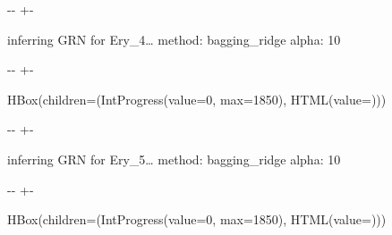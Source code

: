 \documentclass[letterpaper,10pt,english]{sphinxmanual}
\newlength\nbsphinxcodecellspacing
\begin{document}
%
{
\kern-\sphinxverbatimsmallskipamount\kern-\baselineskip
\kern+\FrameHeightAdjust\kern-\fboxrule
\vspace{\nbsphinxcodecellspacing}
%
\begin{sphinxVerbatim}[commandchars=\\\{\}]

inferring GRN for Ery\_4{\ldots}
method: bagging\_ridge
alpha: 10
\end{sphinxVerbatim}
}
\relax

{

\kern-\sphinxverbatimsmallskipamount\kern-\baselineskip
\kern+\FrameHeightAdjust\kern-\fboxrule
\vspace{\nbsphinxcodecellspacing}

%
\begin{sphinxVerbatim}[commandchars=\\\{\}]
HBox(children=(IntProgress(value=0, max=1850), HTML(value=\PYGZsq{}\PYGZsq{})))
\end{sphinxVerbatim}
}



%
{
\kern-\sphinxverbatimsmallskipamount\kern-\baselineskip
\kern+\FrameHeightAdjust\kern-\fboxrule
\vspace{\nbsphinxcodecellspacing}
%
\begin{sphinxVerbatim}[commandchars=\\\{\}]

inferring GRN for Ery\_5{\ldots}
method: bagging\_ridge
alpha: 10
\end{sphinxVerbatim}
}
\relax

{

\kern-\sphinxverbatimsmallskipamount\kern-\baselineskip
\kern+\FrameHeightAdjust\kern-\fboxrule
\vspace{\nbsphinxcodecellspacing}

%
\begin{sphinxVerbatim}[commandchars=\\\{\}]
HBox(children=(IntProgress(value=0, max=1850), HTML(value=\PYGZsq{}\PYGZsq{})))
\end{sphinxVerbatim}
}
\end{document}

